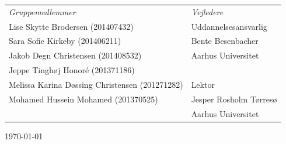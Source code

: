 \begin{titlingpage}
\begin{table}[h]
    \centering
    \begin{tabular}{p{8cm} p{5cm}}
        \textit{Gruppemedlemmer} & \textit{Vejledere} \\
        Lise Skytte Brodersen (201407432)	  & Uddannelsesansvarlig   \\
        Sara Sofie Kirkeby (201406211)   & Bente Besenbacher  \\
        Jakob Degn Christensen (201408532)  & Aarhus Universitet   \\
        Jeppe Tinghøj Honoré (201371186)   &   \\
        Melissa Karina Døssing Christensen (201271282) & Lektor\\
        Mohamed Hussein Mohamed (201370525)   & Jesper Rosholm Tørresø \\
        	&	Aarhus Universitet \\
    \end{tabular}
\end{table}



\vfill

\begin{center}
{\large \today}
\end{center}


\end{titlingpage}
